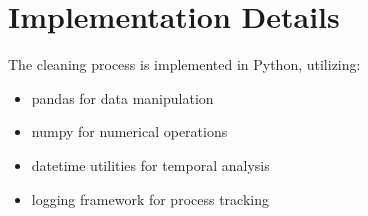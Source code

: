 \documentclass{article}
\begin{document}
\section{Implementation Details}
The cleaning process is implemented in Python, utilizing:
\begin{itemize}[noitemsep]
\item pandas for data manipulation
\item numpy for numerical operations
\item datetime utilities for temporal analysis
\item logging framework for process tracking
\end{itemize}
\end{document}
